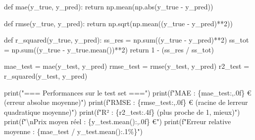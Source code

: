 \documentclass[
  french,
  11pt,
  a4paper,
]{scrbook}
\newenvironment{Shaded}{}{}
\newcommand{\BuiltInTok}[1]{\textcolor[rgb]{0.84,0.23,0.29}{#1}}
\newcommand{\CharTok}[1]{\textcolor[rgb]{0.01,0.18,0.38}{#1}}
\newcommand{\ControlFlowTok}[1]{\textcolor[rgb]{0.84,0.23,0.29}{#1}}
\newcommand{\DecValTok}[1]{\textcolor[rgb]{0.00,0.36,0.77}{#1}}
\newcommand{\KeywordTok}[1]{\textcolor[rgb]{0.84,0.23,0.29}{#1}}
\newcommand{\NormalTok}[1]{\textcolor[rgb]{0.14,0.16,0.18}{#1}}
\newcommand{\OperatorTok}[1]{\textcolor[rgb]{0.14,0.16,0.18}{#1}}
\newcommand{\SpecialCharTok}[1]{\textcolor[rgb]{0.00,0.36,0.77}{#1}}
\newcommand{\SpecialStringTok}[1]{\textcolor[rgb]{0.01,0.18,0.38}{#1}}
\newcommand{\StringTok}[1]{\textcolor[rgb]{0.01,0.18,0.38}{#1}}
\begin{document}
\begin{tcolorbox}[enhanced jigsaw, arc=.35mm, bottomrule=.15mm, bottomtitle=1mm, breakable, colback=white, colbacktitle=quarto-callout-tip-color!10!white, colframe=quarto-callout-tip-color-frame, coltitle=black, left=2mm, leftrule=.75mm, opacityback=0, opacitybacktitle=0.6, rightrule=.15mm, title=\textcolor{quarto-callout-tip-color}{\faLightbulb}\hspace{0.5em}{✅ Corrigé Étape 5.2}, titlerule=0mm, toprule=.15mm, toptitle=1mm]

\begin{Shaded}
\begin{Highlighting}[]
\KeywordTok{def}\NormalTok{ mae(y\_true, y\_pred):}
    \ControlFlowTok{return}\NormalTok{ np.mean(np.}\BuiltInTok{abs}\NormalTok{(y\_true }\OperatorTok{{-}}\NormalTok{ y\_pred))}

\KeywordTok{def}\NormalTok{ rmse(y\_true, y\_pred):}
    \ControlFlowTok{return}\NormalTok{ np.sqrt(np.mean((y\_true }\OperatorTok{{-}}\NormalTok{ y\_pred)}\OperatorTok{**}\DecValTok{2}\NormalTok{))}

\KeywordTok{def}\NormalTok{ r\_squared(y\_true, y\_pred):}
\NormalTok{    ss\_res }\OperatorTok{=}\NormalTok{ np.}\BuiltInTok{sum}\NormalTok{((y\_true }\OperatorTok{{-}}\NormalTok{ y\_pred)}\OperatorTok{**}\DecValTok{2}\NormalTok{)}
\NormalTok{    ss\_tot }\OperatorTok{=}\NormalTok{ np.}\BuiltInTok{sum}\NormalTok{((y\_true }\OperatorTok{{-}}\NormalTok{ y\_true.mean())}\OperatorTok{**}\DecValTok{2}\NormalTok{)}
    \ControlFlowTok{return} \DecValTok{1} \OperatorTok{{-}}\NormalTok{ (ss\_res }\OperatorTok{/}\NormalTok{ ss\_tot)}

\NormalTok{mae\_test }\OperatorTok{=}\NormalTok{ mae(y\_test, y\_pred)}
\NormalTok{rmse\_test }\OperatorTok{=}\NormalTok{ rmse(y\_test, y\_pred)}
\NormalTok{r2\_test }\OperatorTok{=}\NormalTok{ r\_squared(y\_test, y\_pred)}

\BuiltInTok{print}\NormalTok{(}\StringTok{"=== Performances sur le test set ==="}\NormalTok{)}
\BuiltInTok{print}\NormalTok{(}\SpecialStringTok{f"MAE  : }\SpecialCharTok{\{}\NormalTok{mae\_test}\SpecialCharTok{:,.0f\}}\SpecialStringTok{ €       (erreur absolue moyenne)"}\NormalTok{)}
\BuiltInTok{print}\NormalTok{(}\SpecialStringTok{f"RMSE : }\SpecialCharTok{\{}\NormalTok{rmse\_test}\SpecialCharTok{:,.0f\}}\SpecialStringTok{ €      (racine de l\textquotesingle{}erreur quadratique moyenne)"}\NormalTok{)}
\BuiltInTok{print}\NormalTok{(}\SpecialStringTok{f"R²   : }\SpecialCharTok{\{}\NormalTok{r2\_test}\SpecialCharTok{:.4f\}}\SpecialStringTok{            (plus proche de 1, mieux)"}\NormalTok{)}
\BuiltInTok{print}\NormalTok{(}\SpecialStringTok{f"}\CharTok{\textbackslash{}n}\SpecialStringTok{Prix moyen réel : }\SpecialCharTok{\{}\NormalTok{y\_test}\SpecialCharTok{.}\NormalTok{mean()}\SpecialCharTok{:,.0f\}}\SpecialStringTok{ €"}\NormalTok{)}
\BuiltInTok{print}\NormalTok{(}\SpecialStringTok{f"Erreur relative moyenne : }\SpecialCharTok{\{}\NormalTok{mae\_test }\OperatorTok{/}\NormalTok{ y\_test}\SpecialCharTok{.}\NormalTok{mean()}\SpecialCharTok{:.1\%\}}\SpecialStringTok{"}\NormalTok{)}
\end{Highlighting}
\end{Shaded}


\end{tcolorbox}
\end{document}
